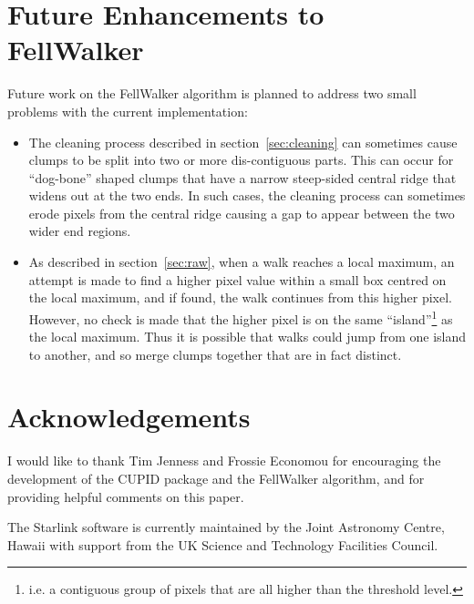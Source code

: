 \documentclass[final,authoryear,5p,times,twocolumn]{elsarticle}
\begin{document}
\section{Future Enhancements to FellWalker}
Future work on the FellWalker algorithm is planned to address two small
problems with the current implementation:

\begin{itemize}
\item The cleaning process described in section~\ref{sec:cleaning} can
sometimes cause clumps to be split into two or more dis-contiguous parts.
This can occur for ``dog-bone'' shaped clumps that have a narrow
steep-sided central ridge that widens out at the two ends. In such cases,
the cleaning process can sometimes erode pixels from the central ridge
causing a gap to appear between the two wider end regions.

\item As described in section~\ref{sec:raw}, when a walk reaches a local
maximum, an attempt is made to find a higher pixel value within a small
box centred on the local maximum, and if found, the walk continues from this
higher pixel. However, no check is made that the higher pixel is on the
same ``island''\footnote{i.e. a contiguous group of
pixels that are all higher than the threshold level.} as the local
maximum. Thus it is possible that walks could jump from one island to
another, and so merge clumps together that are in fact distinct.
\end{itemize}

\section{Acknowledgements}

I would like to thank Tim Jenness and Frossie Economou for encouraging
the development of the CUPID package and the FellWalker algorithm, and
for providing helpful comments on this paper.

The Starlink software is currently maintained by the Joint Astronomy
Centre, Hawaii with support from the UK Science and Technology
Facilities Council.



\end{document}
